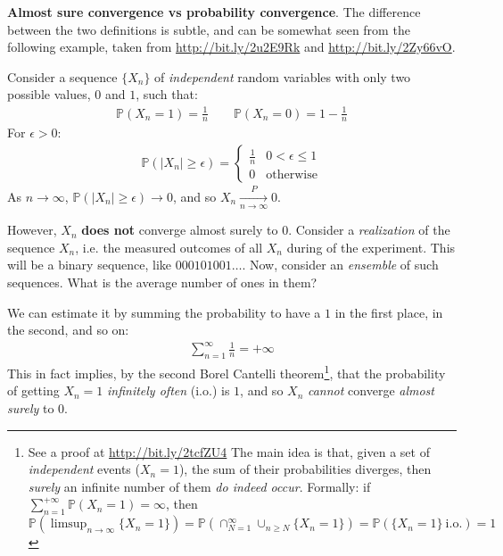 \documentclass[../template.tex]{subfiles}
\begin{document}
\begin{expl}
    \textbf{Almost sure convergence vs probability convergence}. The difference between the two definitions is subtle, and can be somewhat seen from the following example, taken from \url{http://bit.ly/2u2E9Rk} and \url{http://bit.ly/2Zy66vO}.

    Consider a sequence $\{X_n\}$ of \textit{independent} random variables with only two possible values, $0$ and $1$, such that:
    \begin{align*}
        \mathbb{P}(X_n = 1) = \frac{1}{n} \qquad \mathbb{P}(X_n = 0) = 1-\frac{1}{n}  
    \end{align*} 
    For $\epsilon> 0$:
    \begin{align*}
        \mathbb{P}(|X_n| \geq \epsilon) = \begin{cases}
            \frac{1}{n} & 0 < \epsilon \leq 1\\
            0 & \text{otherwise}  
        \end{cases}
    \end{align*} 
    As $n \to\infty$, $\mathbb{P}(|X_n| \geq \epsilon) \to 0$, and so $X_n  \xrightarrow[n \to \infty]{P} 0$.

    However, $X_n$ \textbf{does not} converge almost surely to $0$. Consider a \textit{realization} of the sequence $X_n$, i.e. the measured outcomes of all $X_n$ during  of the experiment. This will be a binary sequence, like $000101001\dots$. Now, consider an \textit{ensemble} of such sequences. What is the average number of ones in them?
    
    We can estimate it by summing the probability to have a $1$ in the first place, in the second, and so on:
    \begin{align*}
        \sum_{n=1}^\infty \frac{1}{n} = +\infty 
    \end{align*}
    This in fact implies, by the second Borel Cantelli theorem\footnote{See a proof at \url{http://bit.ly/2tcfZU4} The main idea is that, given a set of \textit{independent} events ($X_n = 1$), the sum of their probabilities diverges, then \textit{surely} an infinite number of them \textit{do indeed occur}. Formally: if $\sum_{n=1}^{+\infty} \mathbb{P}(X_n=1) = \infty$, then $\mathbb{P}(\limsup_{n \to\infty } \{X_n = 1\}) = \mathbb{P}(\cap_{N=1}^\infty \cup_{n \geq N} \{X_n = 1\}) = \mathbb{P}(\{X_n=1\} \mathrm{\ i.o.}) = 1$}, that the probability of getting $X_n = 1$ \textit{infinitely often} (i.o.) is $1$, and so $X_n$ \textit{cannot} converge \textit{almost surely} to $0$.    
\end{expl}
\end{document}
